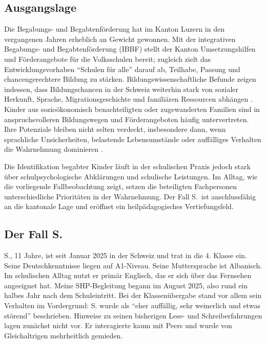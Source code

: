 \documentclass[ngerman, a4paper]{article}
\begin{document}
\subsection*{Ausgangslage}
 
Die Begabungs- und Begabtenförderung hat im Kanton Luzern in den vergangenen Jahren
erheblich an Gewicht gewonnen. Mit der integrativen Begabungs- und Begabtenförderung
(IBBF) stellt der Kanton Umsetzungshilfen und Förderangebote für die Volksschulen bereit;
zugleich zielt das Entwicklungsvorhaben \enquote{Schulen für alle} darauf ab, Teilhabe, Passung
und chancengerechtere Bildung zu stärken. Bildungswissenschaftliche Befunde zeigen
indessen, dass Bildungschancen in der Schweiz weiterhin stark von sozialer Herkunft, Sprache,
Migrationsgeschichte und familiären Ressourcen abhängen
\parencites{erzinger2023pisa}[S.\,576--580]{stamm2021fehlenderblick}{bfs2022migration}{lustat2026ungleichheiten}{skbf2023bildungsbericht}.
Kinder aus sozioökonomisch benachteiligten oder zugewanderten Familien sind in
anspruchsvolleren Bildungswegen und Förderangeboten häufig untervertreten. Ihre Potenziale
bleiben nicht selten verdeckt, insbesondere dann, wenn sprachliche Unsicherheiten, belastende
Lebensumstände oder auffälliges Verhalten die Wahrnehmung dominieren
\parencites[S.\,76--78]{kellerkoller2025hellekoepfe}.

Die Identifikation begabter Kinder läuft in der schulischen Praxis jedoch stark
über schulpsychologische Abklärungen und schulische Leistungen. Im Alltag, wie
die vorliegende Fallbeobachtung zeigt, setzen die beteiligten Fachpersonen
unterschiedliche Prioritäten in der Wahrnehmung. Der Fall S.\ ist
anschlussfähig an die kantonale Lage \parencite{dvs2025bbf} und eröffnet ein
heilpädagogisches Vertiefungsfeld.
 
\subsection*{Der Fall S.}
S., 11 Jahre, ist seit Januar 2025 in der Schweiz und trat in die 4. Klasse ein.
Seine Deutschkenntnisse liegen auf A1-Niveau. Seine Muttersprache ist Albanisch.
Im schulischen Alltag nutzt er primär Englisch, das er sich über das Fernsehen
angeeignet hat. Meine SHP-Begleitung begann im August 2025, also rund ein halbes
Jahr nach dem Schuleintritt. Bei der Klassenübergabe stand vor allem sein Verhalten
im Vordergrund: S. wurde als \enquote{eher auffällig, sehr weinerlich und etwas
störend} beschrieben. Hinweise zu seinen bisherigen Lese- und Schreiberfahrungen
lagen zunächst nicht vor. Er interagierte kaum mit Peers und wurde von
Gleichaltrigen mehrheitlich gemieden.
\end{document}
